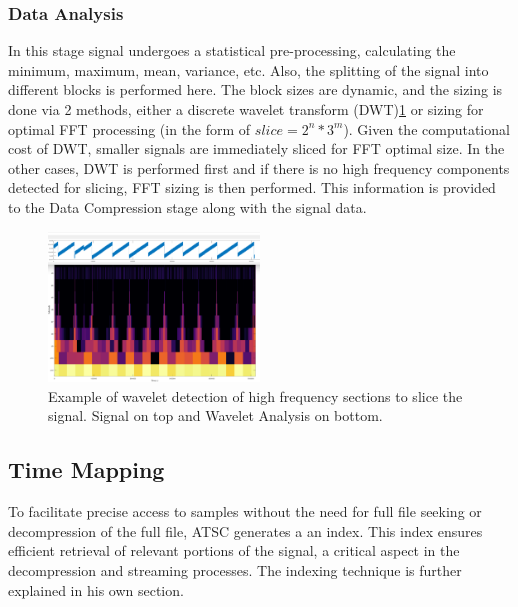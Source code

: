 \documentclass[conference]{IEEEtran}
\begin{document}
\subsubsection{Data Analysis}
In this stage signal undergoes a statistical pre-processing, calculating the minimum, maximum, mean, variance, etc.
Also, the splitting of the signal into different blocks is performed here.
The block sizes are dynamic, and the sizing is done via 2 methods, either a discrete wavelet transform (DWT)\ref{wavelet} or sizing for optimal FFT processing (in the form of $slice = 2^n * 3^m$).
Given the computational cost of DWT, smaller signals are immediately sliced for FFT optimal size. In the other cases, DWT is performed first and if there is no high frequency components detected for slicing, FFT sizing is then performed.
This information is provided to the Data Compression stage along with the signal data.

\begin{figure}[ht]
  \centering
  \includegraphics[width=0.5\textwidth]{wavelet_heap.png}
  \caption{Example of wavelet detection of high frequency sections to slice the signal. Signal on top and Wavelet Analysis on bottom.}
  \label{wavelet}
\end{figure}

\subsection{Time Mapping}
To facilitate precise access to samples without the need for full file seeking or decompression of the full file, ATSC generates a an index. This index ensures efficient retrieval of relevant portions of the signal, a critical aspect in the decompression and streaming processes.
The indexing technique is further explained in his own section.
\end{document}
